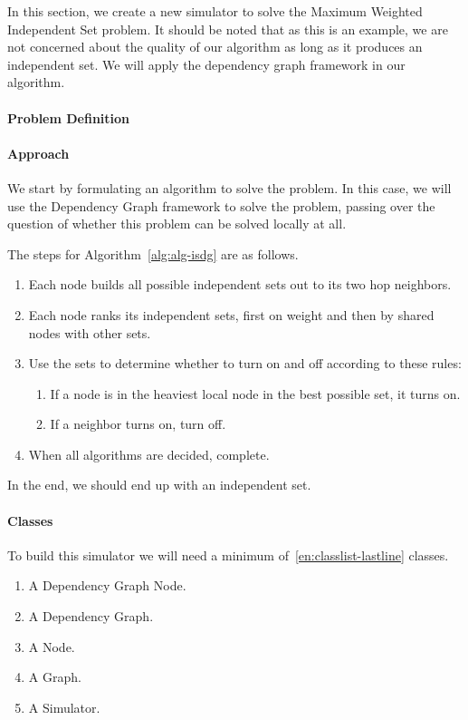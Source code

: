 
\label{sec:sim-new}

In this section, we create a new simulator to solve the Maximum Weighted Independent Set problem. It should be noted that as this is an example, we are not concerned about the quality of our algorithm as long as it produces an independent set. We will apply the dependency graph framework in our algorithm.

\paragraph{Problem Definition}


\paragraph{Approach}

We start by formulating an algorithm to solve the problem. In this case, we will use the Dependency Graph framework to solve the problem, passing over the question of whether this problem can be solved locally at all.

The steps for Algorithm~\ref{alg:alg-isdg} are as follows.

\begin{enumerate}
\item Each node builds all possible independent sets out to its two hop neighbors.
\item Each node ranks its independent sets, first on weight and then by shared nodes with other sets.
\item Use the sets to determine whether to turn on and off according to these rules:
\begin{enumerate}
\item If a node is in the heaviest local node in the best possible set, it turns on.
\item If a neighbor turns on, turn off.
\end{enumerate}
\item When all algorithms are decided, complete.
\end{enumerate}

In the end, we should end up with an independent set.

\paragraph{Classes}

To build this simulator we will need a minimum of~\ref{en:classlist-lastline} classes.
\begin{enumerate}
\item A Dependency Graph Node.
\item A Dependency Graph.
\item A Node.
\item A Graph.
\item A Simulator.\label{en:classlist-lastline}
\end{enumerate}

